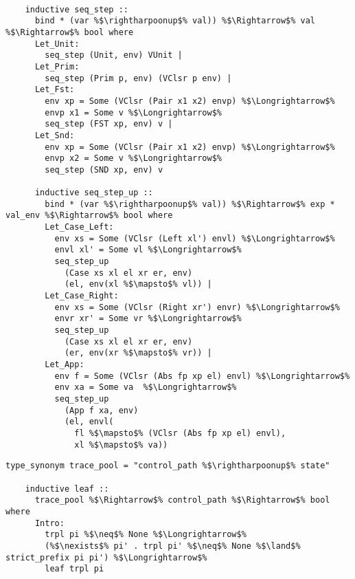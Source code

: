 \documentclass{article}
\begin{document}
  \begin{lstlisting}[style=codestyle1, escapechar=\%]

    inductive seq_step ::
      bind * (var %$\rightharpoonup$% val)) %$\Rightarrow$% val %$\Rightarrow$% bool where
      Let_Unit: 
        seq_step (Unit, env) VUnit |
      Let_Prim:
        seq_step (Prim p, env) (VClsr p env) |
      Let_Fst:
        env xp = Some (VClsr (Pair x1 x2) envp) %$\Longrightarrow$%
        envp x1 = Some v %$\Longrightarrow$% 
        seq_step (FST xp, env) v |
      Let_Snd: 
        env xp = Some (VClsr (Pair x1 x2) envp) %$\Longrightarrow$%  
        envp x2 = Some v %$\Longrightarrow$% 
        seq_step (SND xp, env) v

      inductive seq_step_up ::
        bind * (var %$\rightharpoonup$% val)) %$\Rightarrow$% exp * val_env %$\Rightarrow$% bool where 
        Let_Case_Left:
          env xs = Some (VClsr (Left xl') envl) %$\Longrightarrow$%
          envl xl' = Some vl %$\Longrightarrow$%
          seq_step_up
            (Case xs xl el xr er, env)
            (el, env(xl %$\mapsto$% vl)) |
        Let_Case_Right: 
          env xs = Some (VClsr (Right xr') envr) %$\Longrightarrow$% 
          envr xr' = Some vr %$\Longrightarrow$%
          seq_step_up
            (Case xs xl el xr er, env)
            (er, env(xr %$\mapsto$% vr)) |
        Let_App:
          env f = Some (VClsr (Abs fp xp el) envl) %$\Longrightarrow$% 
          env xa = Some va  %$\Longrightarrow$% 
          seq_step_up
            (App f xa, env)
            (el, envl(
              fl %$\mapsto$% (VClsr (Abs fp xp el) envl),
              xl %$\mapsto$% va))

    \end{lstlisting}


  \begin{lstlisting}[style=codestyle1, escapechar=\%]
    type_synonym trace_pool = "control_path %$\rightharpoonup$% state"

    inductive leaf ::
      trace_pool %$\Rightarrow$% control_path %$\Rightarrow$% bool where
      Intro:
        trpl pi %$\neq$% None %$\Longrightarrow$% 
        (%$\nexists$% pi' . trpl pi' %$\neq$% None %$\land$% strict_prefix pi pi') %$\Longrightarrow$%  
        leaf trpl pi

    \end{lstlisting}
\end{document}
